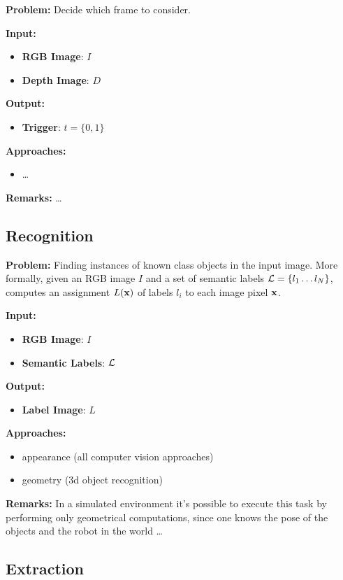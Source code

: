 \documentclass{article}
\begin{document}
	{\bf Problem: } Decide which frame to consider.

	\noindent
	{\bf Input: }
	\begin{itemize}
		\item {\bf RGB Image}: $I$
		\item {\bf Depth Image}: $D$
	\end{itemize}
	\noindent
	{\bf Output: }
	\begin{itemize}
		\item {\bf Trigger}: $t = \{0,1\}$
	\end{itemize}
	\noindent
	{\bf Approaches: }
	\begin{itemize}
		\item \dots
	\end{itemize}
	\noindent
	{\bf Remarks: } \dots
	
	\subsection{Recognition}			
	 
	{\bf Problem: } Finding instances of known class objects in the input image. More formally, given an RGB image $I$ and a set of semantic labels $\mathcal{L} = \{ l_1 \dots l_N \}$, computes an assignment $L(\mathbf{x})$ of labels $l_i$ to each image pixel $\mathbf{x}$.
	
	\noindent
	{\bf Input: }
	\begin{itemize}
		\item {\bf RGB Image}: $I$
		\item {\bf Semantic Labels}: $\mathcal{L}$
	\end{itemize}
	\noindent
	{\bf Output: }
	\begin{itemize}
		\item {\bf Label Image}: $L$
	\end{itemize}
	\noindent
	{\bf Approaches: }
	\begin{itemize}
		\item appearance (all computer vision approaches)
		\item geometry (3d object recognition)
	\end{itemize}
	\noindent
	{\bf Remarks: } In a simulated environment it's possible to execute this task by performing only geometrical computations, since one knows the pose of the objects and the robot in the world \dots
	
	\subsection{Extraction}
	
\end{document}
